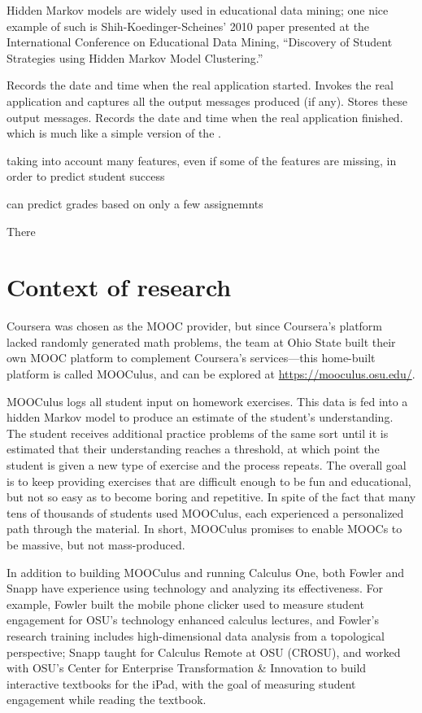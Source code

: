 \documentclass[12pt]{article}
\begin{document}
Hidden Markov models are widely used in educational data mining; one
nice example of such is Shih-Koedinger-Scheines' 2010 paper
presented at the International Conference on Educational Data Mining,
``Discovery of Student Strategies using Hidden Markov Model
Clustering.''  \parencite{shihdiscovery}


Records the date and time when the real application started.
Invokes the real application and captures all the output messages produced (if any).
Stores these output messages.
Records the date and time when the real application finished.
\parencite{RomeroZaldivar20121058} 
which is much like a simple version of the \parencite{tin-can-api}.


taking into account many features, even if some of the features are
missing, in order to predict student
success \parencite{Zafra201115020}

can predict grades based on only a few assignemnts \parencite{predict-grades}


There 



\section{Context of research}

Coursera was chosen as the MOOC provider, but since Coursera's
platform lacked randomly generated math problems, the team at Ohio
State built their own MOOC platform to complement Coursera's
services---this home-built platform is called MOOCulus, and can be
explored at \url{https://mooculus.osu.edu/}.

MOOCulus logs all student input on homework exercises. This data is
fed into a hidden Markov model to produce an estimate of the student's
understanding. The student receives additional practice problems of
the same sort until it is estimated that their understanding reaches a
threshold, at which point the student is given a new type of exercise
and the process repeats.  The overall goal is to keep providing
exercises that are difficult enough to be fun and educational, but not
so easy as to become boring and repetitive.  In spite of the fact that
many tens of thousands of students used MOOCulus, each experienced a
personalized path through the material.  In short, MOOCulus promises
to enable MOOCs to be massive, but not mass-produced.

In addition to building MOOCulus and running Calculus One, both Fowler
and Snapp have experience using technology and analyzing its
effectiveness.  For example, Fowler built the mobile phone clicker
used to measure student engagement for OSU's technology enhanced
calculus lectures, and Fowler's research training includes
high-dimensional data analysis from a topological perspective; Snapp
taught for Calculus Remote at OSU (CROSU), and worked with OSU's
Center for Enterprise Transformation \& Innovation to build
interactive textbooks for the iPad, with the goal of measuring student
engagement while reading the textbook.
\end{document}
